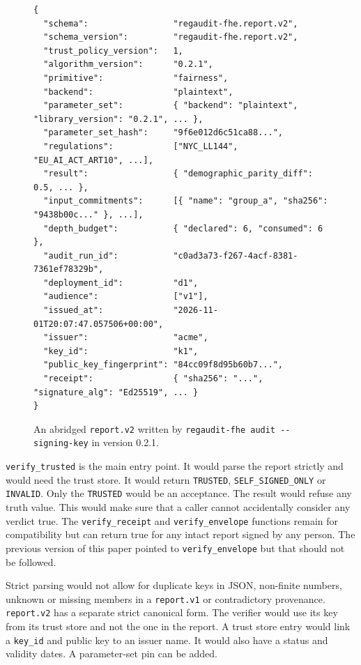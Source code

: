 \documentclass[10pt,a4paper]{article}
\begin{document}
\begin{figure}[h]
\begin{lstlisting}
{
  "schema":                 "regaudit-fhe.report.v2",
  "schema_version":         "regaudit-fhe.report.v2",
  "trust_policy_version":   1,
  "algorithm_version":      "0.2.1",
  "primitive":              "fairness",
  "backend":                "plaintext",
  "parameter_set":          { "backend": "plaintext", "library_version": "0.2.1", ... },
  "parameter_set_hash":     "9f6e012d6c51ca88...",
  "regulations":            ["NYC_LL144", "EU_AI_ACT_ART10", ...],
  "result":                 { "demographic_parity_diff": 0.5, ... },
  "input_commitments":      [{ "name": "group_a", "sha256": "9438b00c..." }, ...],
  "depth_budget":           { "declared": 6, "consumed": 6 },
  "audit_run_id":           "c0ad3a73-f267-4acf-8381-7361ef78329b",
  "deployment_id":          "d1",
  "audience":               ["v1"],
  "issued_at":              "2026-11-01T20:07:47.057506+00:00",
  "issuer":                 "acme",
  "key_id":                 "k1",
  "public_key_fingerprint": "84cc09f8d95b60b7...",
  "receipt":                { "sha256": "...", "signature_alg": "Ed25519", ... }
}
\end{lstlisting}
\caption{An abridged \texttt{report.v2} written by \texttt{regaudit-fhe audit -{}-signing-key} in version 0.2.1.}
\end{figure}

\texttt{verify\_trusted} is the main entry point. It would parse the report strictly and would need the trust store. It would return \texttt{TRUSTED}, \texttt{SELF\_SIGNED\_ONLY} or \texttt{INVALID}. Only the \texttt{TRUSTED} would be an acceptance. The result would refuse any truth value. This would make sure that a caller cannot accidentally consider any verdict true. The \texttt{verify\_receipt} and \texttt{verify\_envelope} functions remain for compatibility but can return true for any intact report signed by any person. The previous version of this paper pointed to \texttt{verify\_envelope} but that should not be followed.

Strict parsing would not allow for duplicate keys in JSON, non-finite numbers, unknown or missing members in a \texttt{report.v1} or contradictory provenance. \texttt{report.v2} has a separate strict canonical form. The verifier would use its key from its trust store and not the one in the report. A trust store entry would link a \texttt{key\_id} and public key to an issuer name. It would also have a status and validity dates. A parameter-set pin can be added.
\end{document}
